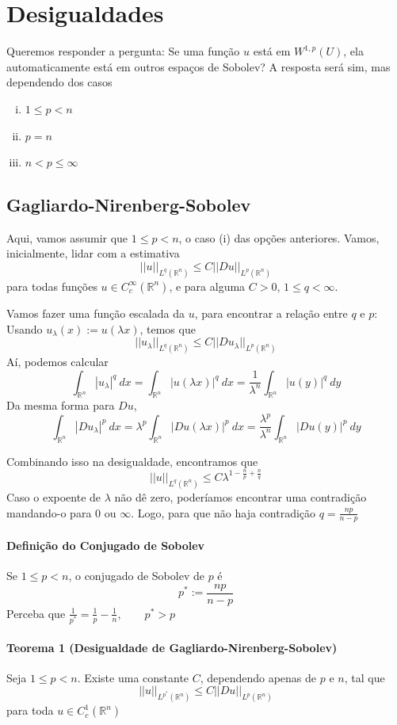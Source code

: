 \documentclass[11pt]{article}
\newcommand{\Rn}{{\mathbb{R}^n}}
\newcommand{\nor}[2]{||#1||_{#2}}
\begin{document}
\section{Desigualdades}

Queremos responder a pergunta: Se uma função $ u $ está em $ W^{1,p}(U) $, ela automaticamente está em outros espaços de Sobolev? A resposta será sim, mas dependendo dos casos \begin{enumerate}[(i)]
	\item $ 1 \leq p < n $
	\item $ p = n $
	\item $ n < p \leq \infty $
\end{enumerate}

\subsection{Gagliardo-Nirenberg-Sobolev}

Aqui, vamos assumir que $ 1 \leq p < n $, o caso (i) das opções anteriores. Vamos, inicialmente, lidar com a estimativa \[ \nor{u}{L^q(\Rn)} \leq C \nor{Du}{L^p(\Rn)}\] para todas funções $ u \in C^\infty_c(\Rn) $, e para alguma $ C>0 $, $ 1 \leq q < \infty $.

Vamos fazer uma função escalada da $ u $, para encontrar a relação entre $ q $ e $ p $: Usando $ u_{\lambda}(x):=u(\lambda x) $, temos que \[ \nor{u_{\lambda}}{L^q(\Rn)} \leq C \nor{Du_\lambda}{L^p(\Rn)}\] Aí, podemos calcular \[ \int_\Rn |u_{\lambda}|^q\ dx =  \int_\Rn |u(\lambda x)|^q\ dx = \frac{1}{\lambda^n} \int_\Rn |u(y)|^q\ dy\] Da mesma forma para $ Du $, \[ \int_\Rn |Du_{\lambda}|^p\ dx =  \lambda^p \int_\Rn |Du(\lambda x)|^p\ dx = \frac{\lambda^p}{\lambda^n} \int_\Rn |Du(y)|^p\ dy\]

Combinando isso na desigualdade, encontramos que \[ \nor{u}{L^q(\Rn)} \leq C \lambda^{1 - \frac{n}{p} + \frac{n}{q} }\] Caso o expoente de $\lambda$ não dê zero, poderíamos encontrar uma contradição mandando-o para 0 ou $\infty$. Logo, para que não haja contradição $ q = \frac{np}{n-p} $

\paragraph{Definição do Conjugado de Sobolev} Se $ 1\leq p < n $, o conjugado de Sobolev de $p$ é \[ p^* := \frac{np}{n-p} \] Perceba que $ \frac{1}{p^*} = \frac{1}{p} - \frac{1}{n}, \qquad p^* > p $


\paragraph{Teorema 1 (Desigualdade de Gagliardo-Nirenberg-Sobolev)}\label{t:sobolev-ineq-t1} Seja $ 1 \leq p < n $. Existe uma constante $C$, dependendo apenas de $p$ e $n$, tal que \[ ||u||_{L^{p^*}(\Rn)} \leq C \left|\left|Du\right|\right|_{L^{p}(\Rn)} \] para toda $u \in C^1_c(\Rn)$
\end{document}
